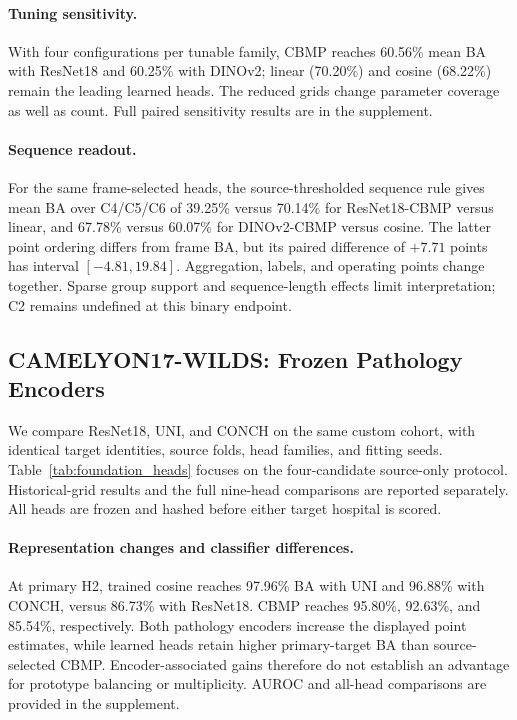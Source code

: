 \paragraph{Tuning sensitivity.}
With four configurations per tunable family, CBMP reaches 60.56\% mean BA with ResNet18 and 60.25\% with DINOv2; linear (70.20\%) and cosine (68.22\%) remain the leading learned heads. The reduced grids change parameter coverage as well as count. Full paired sensitivity results are in the supplement.

\paragraph{Sequence readout.}
For the same frame-selected heads, the source-thresholded sequence rule gives mean BA over C4/C5/C6 of 39.25\% versus 70.14\% for ResNet18-CBMP versus linear, and 67.78\% versus 60.07\% for DINOv2-CBMP versus cosine. The latter point ordering differs from frame BA, but its paired difference of $+7.71$ points has interval $[-4.81,19.84]$. Aggregation, labels, and operating points change together. Sparse group support and sequence-length effects limit interpretation; C2 remains undefined at this binary endpoint.


\subsection{CAMELYON17-WILDS: Frozen Pathology Encoders}
\label{sec:pathology_foundation}

We compare ResNet18, UNI, and CONCH on the same custom cohort, with identical target identities, source folds, head families, and fitting seeds. Table~\ref{tab:foundation_heads} focuses on the four-candidate source-only protocol. Historical-grid results and the full nine-head comparisons are reported separately. All heads are frozen and hashed before either target hospital is scored.



\paragraph{Representation changes and classifier differences.}
At primary H2, trained cosine reaches 97.96\% BA with UNI and 96.88\% with CONCH, versus 86.73\% with ResNet18. CBMP reaches 95.80\%, 92.63\%, and 85.54\%, respectively. Both pathology encoders increase the displayed point estimates, while learned heads retain higher primary-target BA than source-selected CBMP. Encoder-associated gains therefore do not establish an advantage for prototype balancing or multiplicity. AUROC and all-head comparisons are provided in the supplement.

